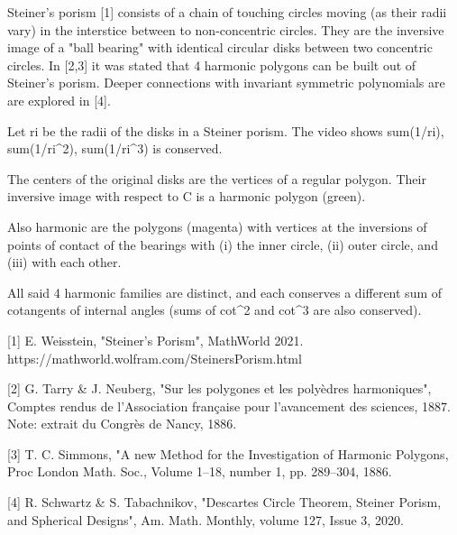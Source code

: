 Steiner's porism [1] consists of a chain of touching circles moving (as their radii vary) in the interstice between to non-concentric circles. They are the inversive image of a "ball bearing" with identical circular disks between two concentric circles. In [2,3] it was stated that 4 harmonic polygons can be built out of Steiner's porism. Deeper connections with invariant symmetric polynomials are are explored in [4].

Let ri be the radii of the disks in a Steiner porism. The video shows sum(1/ri), sum(1/ri^2), sum(1/ri^3) is conserved.

The centers of the original disks are the vertices of a regular polygon. Their inversive image with respect to C is a harmonic polygon (green).

Also harmonic are the polygons (magenta) with vertices at the inversions of points of contact of the bearings with (i) the inner circle, (ii) outer circle, and (iii) with each other.

All said 4 harmonic families are distinct, and each conserves a different sum of cotangents of internal angles (sums of cot^2 and cot^3 are also conserved).


[1] E. Weisstein, "Steiner's Porism", MathWorld 2021. https://mathworld.wolfram.com/SteinersPorism.html

[2] G. Tarry & J. Neuberg, "Sur les polygones et les polyèdres harmoniques", Comptes rendus de l'Association française pour l'avancement des sciences, 1887. Note: extrait du Congrès de Nancy, 1886.

[3] T. C. Simmons, "A new Method for the Investigation of Harmonic Polygons, Proc London Math. Soc., Volume 1--18, number 1, pp. 289--304, 1886.

[4] R. Schwartz & S. Tabachnikov, "Descartes Circle Theorem, Steiner Porism, and Spherical Designs", Am. Math. Monthly, volume 127, Issue 3, 2020.